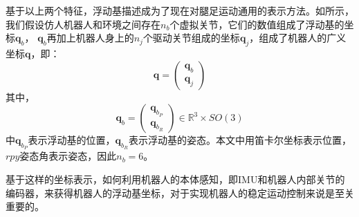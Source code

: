 基于以上两个特征，浮动基描述成为了现在对腿足运动通用的表示方法。如所示，我们假设仿人机器人和环境之间存在$n_b$个虚拟关节，它们的数值组成了浮动基的坐标$\boldsymbol{q}_b$，
$\boldsymbol{q}_b$再加上机器人身上的$n_j$个驱动关节组成的坐标$\boldsymbol{q}_j$，组成了机器人的广义坐标$\boldsymbol{q}$，即：
\begin{equation}
    \label{equ:general_coor}
    \boldsymbol{q}=\left(\begin{array}{c}
        \boldsymbol{q}_b \\
        \boldsymbol{q}_j
        \end{array}\right)
\end{equation}
其中，
\begin{equation}
    \label{equ:floating_coor}
    \boldsymbol{q}_b=\left(\begin{array}{c}
        \boldsymbol{q}_{b_P} \\
        \boldsymbol{q}_{b_R}
        \end{array}\right) \in \mathbb{R}^3 \times SO(3)
\end{equation}
中$ \boldsymbol{q}_{b_P}$表示浮动基的位置，$\boldsymbol{q}_{b_R}$表示浮动基的姿态。本文中用笛卡尔坐标表示位置，$rpy$姿态角表示姿态，因此$n_b = 6$。

基于这样的坐标表示，如何利用机器人的本体感知，即IMU和机器人内部关节的编码器，来获得机器人的浮动基坐标，对于实现机器人的稳定运动控制来说是至关重要的。

